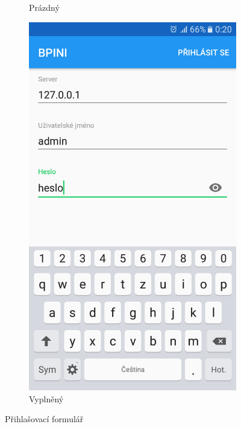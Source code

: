 \documentclass[12pt]{report}
\begin{document}
\begin{figure}[H]
\begin{subfigure}[b]{0.3\textwidth}
	\caption{Prázdný}
	\label{fig:Screenshot_20170610-134211}
  \end{subfigure}
  \begin{subfigure}[b]{0.3\textwidth}
    \centering
	\includegraphics[width=\textwidth]{../images/client_android/Screenshot_20170612-002041.png}	
	\caption{Vyplněný}
	\label{fig:Screenshot_20170612-002041}
  \end{subfigure}
  \caption{Přihlašovací formulář}
\end{figure}
\end{document}
